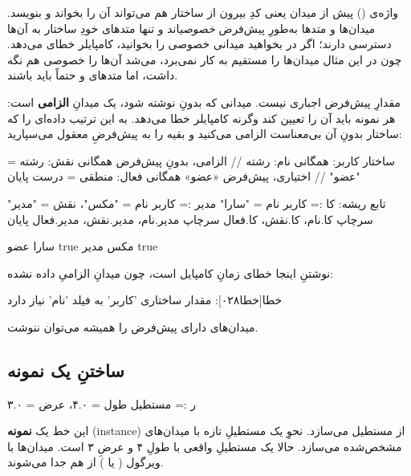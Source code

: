 واژه‌ی  () پیش از میدان یعنی کدِ بیرون از ساختار هم
می‌تواند آن را بخواند و بنویسد. میدان‌ها و متدها به‌طورِ پیش‌فرض \emph{خصوصی}اند
و تنها متدهای خودِ ساختار به آن‌ها دسترسی دارند؛ اگر در  بخواهید
میدانی خصوصی را بخوانید، کامپایلر خطای  می‌دهد. چون در این مثال
 میدان‌ها را مستقیم به کار نمی‌برد، می‌شد آن‌ها را خصوصی هم نگه داشت،
اما متدهای  و  حتماً باید  باشند.

مقدارِ پیش‌فرض اجباری نیست. میدانی که بدونِ  نوشته شود، یک میدانِ
\textbf{الزامی} است: هر نمونه باید آن را تعیین کند وگرنه کامپایلر خطا می‌دهد. به
این ترتیب داده‌ای را که ساختار بدونِ آن بی‌معناست الزامی می‌کنید و بقیه را به
پیش‌فرضِ معقول می‌سپارید:

\begin{salamfa}
ساختار کاربر:
    همگانی نام: رشته                 // الزامی، بدونِ پیش‌فرض
    همگانی نقش: رشته = "عضو"         // اختیاری، پیش‌فرض «عضو»
    همگانی فعال: منطقی = درست
پایان

تابع ریشه:
    کا := کاربر { نام = "سارا" }
    مدیر := کاربر { نام = "مکس"، نقش = "مدیر" }
    سرچاپ کا.نام، کا.نقش، کا.فعال
    سرچاپ مدیر.نام، مدیر.نقش، مدیر.فعال
پایان
\end{salamfa}

\begin{progoutfa}
سارا عضو true
مکس مدیر true
\end{progoutfa}

نوشتنِ  اینجا خطای زمانِ کامپایل است، چون میدانِ الزامیِ
 داده نشده:

\begin{progoutfa}
خطا[خطا۰۲۸]: مقدار ساختاری 'کاربر' به فیلد 'نام' نیاز دارد
\end{progoutfa}

میدان‌های دارای پیش‌فرض را همیشه می‌توان ننوشت.

\subsection{ساختنِ یک نمونه}

\begin{salamfa}
ر := مستطیل { طول = ۴.۰، عرض = ۳.۰ }
\end{salamfa}

این خط یک \textbf{نمونه} (instance) از مستطیل می‌سازد. نحوِ 
یک مستطیلِ تازه با میدان‌های مشخص‌شده می‌سازد. حالا  یک مستطیلِ واقعی
با طولِ ۴ و عرضِ ۳ است. میدان‌ها با ویرگول ( یا \code{,}) از هم جدا
می‌شوند.

